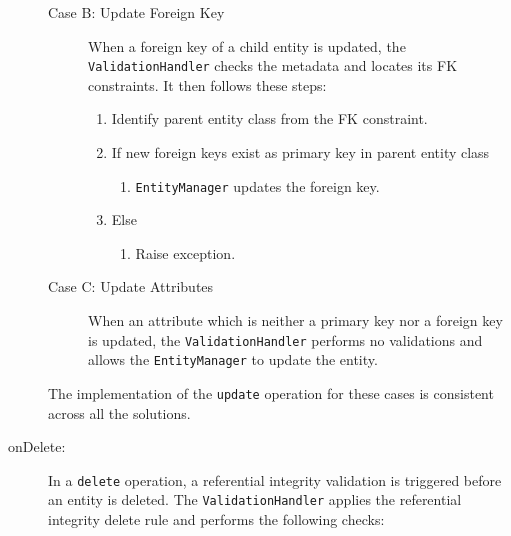 \begin{description}
\begin{description}
		 
		\item[Case B: Update Foreign Key] When a foreign key of a child entity is
		updated,  the  \texttt{ValidationHandler} checks  the
		metadata and locates its \ac{FK} constraints.  It then follows these steps:
		\begin{enumerate}
		  \item Identify parent entity class from the \ac{FK} constraint. 
		  \item If new foreign keys exist as primary key in parent entity class
			\begin{enumerate}
				\item \texttt{EntityManager} updates  the foreign key. 
			\end{enumerate}
		  \item Else 
			\begin{enumerate}
				\item Raise exception. 
			\end{enumerate}
		\end{enumerate}
		
		\item[Case C: Update Attributes] When an attribute which is neither a primary
		key nor a foreign key is updated, the \texttt{ValidationHandler} performs no
		validations and allows the \texttt{EntityManager} to update the entity. 
		
		\end{description}
		
		The implementation of the \texttt{update} operation for these cases is
		consistent across all the solutions. 
		
	\item[onDelete:] 
		In a \texttt{delete} operation, a referential
		integrity validation is triggered before an entity is deleted.  The
		\texttt{ValidationHandler} applies the referential integrity delete rule
		and performs the following checks:
		\renewcommand{\labelenumii}{\arabic{enumi}. \arabic{enumii}}
		\renewcommand{\labelenumiii}{\arabic{enumi}. \arabic{enumii}. \arabic{enumiii}}
		

\end{description}
